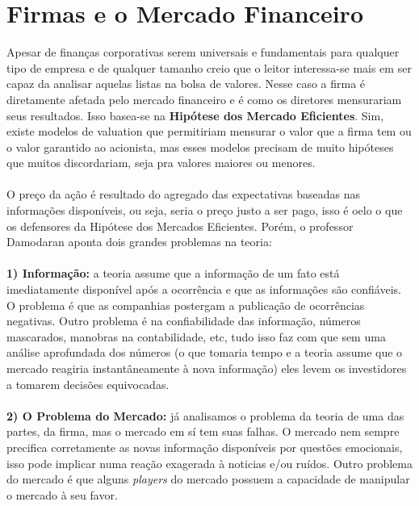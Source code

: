 \section{Firmas e o Mercado Financeiro}
Apesar de finanças corporativas serem universais e fundamentais para qualquer tipo de empresa e de qualquer tamanho creio que o leitor interessa-se mais em ser capaz da analisar aquelas listas na bolsa de valores. Nesse caso a firma é diretamente afetada pelo mercado financeiro e é como os diretores mensurariam seus resultados. Isso basea-se na \textbf{Hipótese dos Mercado Eficientes}. Sim, existe modelos de valuation que permitiriam mensurar o valor que a firma tem ou o valor garantido ao acionista, mas esses modelos precisam de muito hipóteses que muitos discordariam, seja pra valores maiores ou menores.
\\~\\
O preço da ação é resultado do agregado das expectativas baseadas nas informações disponíveis, ou seja, seria o preço justo a ser pago, isso é oelo o que os defensores da Hipótese dos Mercados Eficientes. Porém, o professor Damodaran aponta dois grandes problemas na teoria:
\\~\\
\textbf{1) Informação:} a teoria assume que a informação de um fato está imediatamente disponível após a ocorrência e que as informações são confiáveis. O problema é que as companhias postergam a publicação de ocorrências negativas. Outro problema é na confiabilidade das informação, números mascarados, manobras na contabilidade, etc, tudo isso faz com que sem uma análise aprofundada dos números (o que tomaria tempo e a teoria assume que o mercado reagiria instantâneamente à nova informação) eles levem os investidores a tomarem decisões equivocadas.
\\~\\
\textbf{2) O Problema do Mercado:} já analisamos o problema da teoria de uma das partes, da firma, mas o mercado em sí tem suas falhas. O mercado nem sempre precifica corretamente as novas informação disponíveis por questões emocionais, isso pode implicar numa reação exagerada à noticias e/ou ruídos. Outro problema do mercado é que alguns \textit{players} do mercado possuem a capacidade de manipular o mercado à seu favor.

